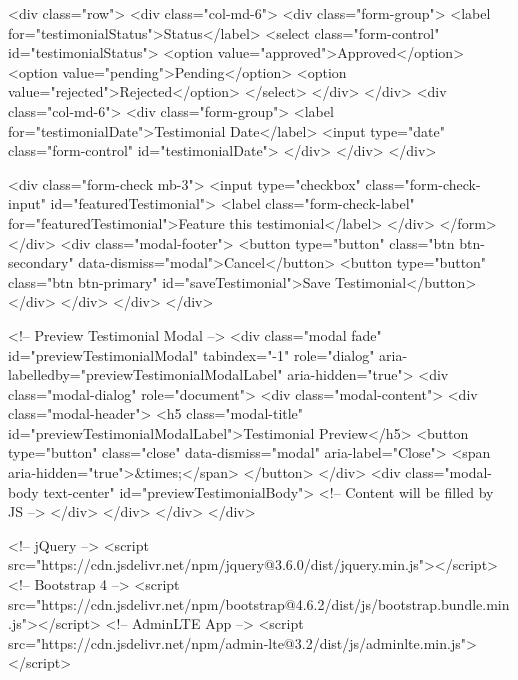                     <div class="row">
                        <div class="col-md-6">
                            <div class="form-group">
                                <label for="testimonialStatus">Status</label>
                                <select class="form-control" id="testimonialStatus">
                                    <option value="approved">Approved</option>
                                    <option value="pending">Pending</option>
                                    <option value="rejected">Rejected</option>
                                </select>
                            </div>
                        </div>
                        <div class="col-md-6">
                            <div class="form-group">
                                <label for="testimonialDate">Testimonial Date</label>
                                <input type="date" class="form-control" id="testimonialDate">
                            </div>
                        </div>
                    </div>
                    
                    <div class="form-check mb-3">
                        <input type="checkbox" class="form-check-input" id="featuredTestimonial">
                        <label class="form-check-label" for="featuredTestimonial">Feature this testimonial</label>
                    </div>
                </form>
            </div>
            <div class="modal-footer">
                <button type="button" class="btn btn-secondary" data-dismiss="modal">Cancel</button>
                <button type="button" class="btn btn-primary" id="saveTestimonial">Save Testimonial</button>
            </div>
        </div>
    </div>
</div>

<!-- Preview Testimonial Modal -->
<div class="modal fade" id="previewTestimonialModal" tabindex="-1" role="dialog" aria-labelledby="previewTestimonialModalLabel" aria-hidden="true">
  <div class="modal-dialog" role="document">
    <div class="modal-content">
      <div class="modal-header">
        <h5 class="modal-title" id="previewTestimonialModalLabel">Testimonial Preview</h5>
        <button type="button" class="close" data-dismiss="modal" aria-label="Close">
          <span aria-hidden="true">&times;</span>
        </button>
      </div>
      <div class="modal-body text-center" id="previewTestimonialBody">
        <!-- Content will be filled by JS -->
      </div>
    </div>
  </div>
</div>

<!-- jQuery -->
<script src="https://cdn.jsdelivr.net/npm/jquery@3.6.0/dist/jquery.min.js"></script>
<!-- Bootstrap 4 -->
<script src="https://cdn.jsdelivr.net/npm/bootstrap@4.6.2/dist/js/bootstrap.bundle.min.js"></script>
<!-- AdminLTE App -->
<script src="https://cdn.jsdelivr.net/npm/admin-lte@3.2/dist/js/adminlte.min.js"></script>

